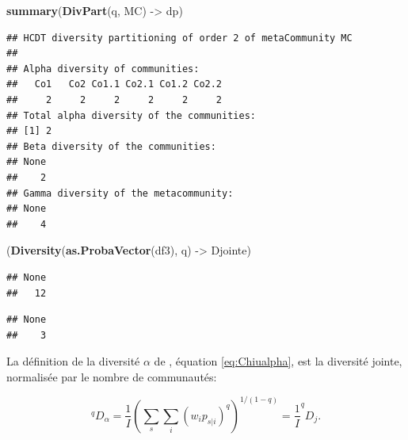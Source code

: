 \documentclass[
  11pt,
  french,
  a4paper,
  extrafontsizes,onecolumn,openright
  ]{memoir}
\newenvironment{Shaded}{\begin{snugshade}}{\end{snugshade}}
\newcommand{\KeywordTok}[1]{\textcolor[rgb]{0.13,0.29,0.53}{\textbf{#1}}}
\newcommand{\NormalTok}[1]{#1}
\newcommand{\OperatorTok}[1]{\textcolor[rgb]{0.81,0.36,0.00}{\textbf{#1}}}
\newcommand{\StringTok}[1]{\textcolor[rgb]{0.31,0.60,0.02}{#1}}
\begin{document}
\normalsize

\scriptsize

\begin{Shaded}
\begin{Highlighting}[]
\KeywordTok{summary}\NormalTok{(}\KeywordTok{DivPart}\NormalTok{(q, MC) ->}\StringTok{ }\NormalTok{dp)}
\end{Highlighting}
\end{Shaded}

\begin{verbatim}
## HCDT diversity partitioning of order 2 of metaCommunity MC
## 
## Alpha diversity of communities: 
##   Co1   Co2 Co1.1 Co2.1 Co1.2 Co2.2 
##     2     2     2     2     2     2 
## Total alpha diversity of the communities: 
## [1] 2
## Beta diversity of the communities: 
## None 
##    2 
## Gamma diversity of the metacommunity: 
## None 
##    4
\end{verbatim}

\begin{Shaded}
\begin{Highlighting}[]
\NormalTok{(}\KeywordTok{Diversity}\NormalTok{(}\KeywordTok{as.ProbaVector}\NormalTok{(df3), q) ->}\StringTok{ }\NormalTok{Djointe)}
\end{Highlighting}
\end{Shaded}

\begin{verbatim}
## None 
##   12
\end{verbatim}

\begin{Shaded}
\end{Shaded}

\begin{verbatim}
## None 
##    3
\end{verbatim}

\normalsize

La définition de la diversité \(\alpha\) de \textcite{Chiu2014}, équation \eqref{eq:Chiualpha}, est la diversité jointe, normalisée par le nombre de communautés:

\begin{equation}
  \label{eq:Chiualphajointe}
  ^{q}\!D_{\alpha}
  = \frac{1}{I} {\left(\sum_s{\sum_i{{\left(w_i p_{s|i}\right)}^q}}\right)}^{{1}/{\left(1-q\right)}}
  = \frac{1}{I} ^{q}\!D_{j}.
\end{equation}
\end{document}
